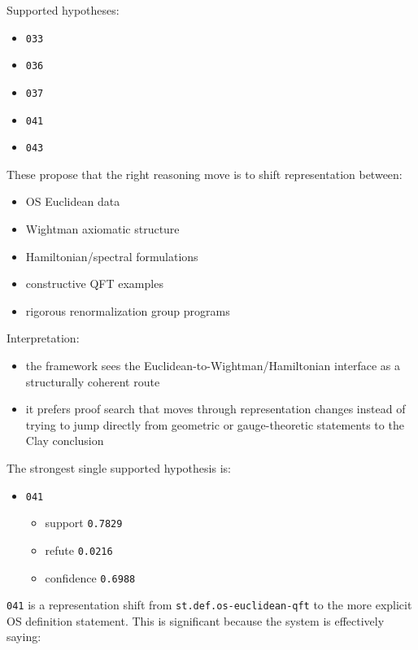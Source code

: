 \documentclass[
]{article}
\providecommand{\tightlist}{%
  \setlength{\itemsep}{0pt}\setlength{\parskip}{0pt}}
\begin{document}
Supported hypotheses:

\begin{itemize}
\tightlist
\item
  \texttt{033}
\item
  \texttt{036}
\item
  \texttt{037}
\item
  \texttt{041}
\item
  \texttt{043}
\end{itemize}

These propose that the right reasoning move is to shift representation
between:

\begin{itemize}
\tightlist
\item
  OS Euclidean data
\item
  Wightman axiomatic structure
\item
  Hamiltonian/spectral formulations
\item
  constructive QFT examples
\item
  rigorous renormalization group programs
\end{itemize}

Interpretation:

\begin{itemize}
\tightlist
\item
  the framework sees the Euclidean-to-Wightman/Hamiltonian interface as
  a structurally coherent route
\item
  it prefers proof search that moves through representation changes
  instead of trying to jump directly from geometric or gauge-theoretic
  statements to the Clay conclusion
\end{itemize}

The strongest single supported hypothesis is:

\begin{itemize}
\tightlist
\item
  \texttt{041}

  \begin{itemize}
  \tightlist
  \item
    support \texttt{0.7829}
  \item
    refute \texttt{0.0216}
  \item
    confidence \texttt{0.6988}
  \end{itemize}
\end{itemize}

\texttt{041} is a representation shift from
\texttt{st.def.os-euclidean-qft} to the more explicit OS definition
statement. This is significant because the system is effectively saying:
\end{document}

